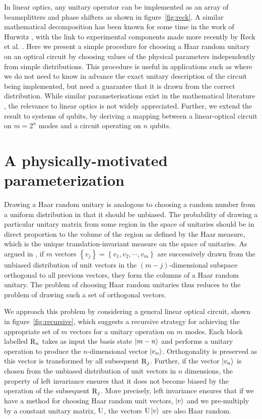In linear optics, any unitary operator can be implemented as an array of
beamsplitters and phase shifters as shown in figure~\ref{fig:reck}. A similar
mathematical decomposition has been known for some time in the work of Hurwitz
\cite{hurwitz}, with the link to experimental components made more recently by
Reck et al. \cite{reck}. Here we present a simple procedure for choosing
a Haar random unitary on an optical circuit by choosing values of the physical
parameters independently from simple distributions. This procedure is useful in
applications such as \bosonsampling{} where we do not need to know in advance
the exact
unitary description of the circuit being implemented, but need a guarantee that
it is drawn from the correct distribution. While similar parameterisations exist
in the mathematical literature \cite{spengler2012, zy-jpa-27-4235}, the
relevance to linear optics is not widely appreciated. Further, we extend the
result to systems of qubits, by deriving a mapping between a linear-optical
circuit on \(m=2^{n}\) modes and a circuit operating on \(n\) qubits.

\section{A physically-motivated parameterization}
\label{sec:Parameterization}
Drawing a Haar random unitary is analogous to choosing a random number from a
uniform distribution in that it should be unbiased. The probability of drawing
a particular unitary matrix from some region in the space of unitaries should
be in direct proportion to the volume of the region as defined by the Haar
measure, which is the unique translation-invariant measure on the space of
unitaries. As argued in \cite{reffy}, if \(m\) vectors \(\left\{
v_{j} \right\} = \left\{ v_{1}, v_{2}, \cdots, v_{m} \right\}\) are successively
drawn from the unbiased distribution of unit vectors in the
\(\left(m-j\right)\)-dimensional subspace orthogonal to all previous vectors,
they form the columns of a Haar random unitary. The problem of choosing Haar
random unitaries thus reduces to the problem of drawing such a set of orthogonal
vectors.

We approach this problem by considering a general linear optical circuit, shown
in figure~\ref{fig:recursive}, which suggests a recursive strategy for
achieving the appropriate set of \(m\) vectors for a unitary operation on \(m\)
modes. Each block labelled \(\mathrm{R}_{n}\) takes
as input the basis state \( \left|m-n\right\rangle\) and performs a unitary operation to
produce the \(n\)-dimensional vector \(\left|v_n\right\rangle\). Orthogonality is preserved
as this vector is transformed by all subsequent \(\mathrm{R}_{j}\). Further, if the
vector \(\left|v_{n}\right\rangle\) is chosen from the unbiased distribution of unit vectors
in \(n\) dimensions, the property of left invariance ensures that it does not
become biased by the operation of the subsequent \(\mathrm{R}_{j}\). More
precisely, left invariance ensures that if we have a method for choosing Haar
random unit vectors, \(\left|v\right\rangle\) and we pre-multiply by a constant unitary
matrix, \(\mathrm{U}\), the vectors \(\mathrm{U} \left|v\right\rangle\) are also Haar random.

